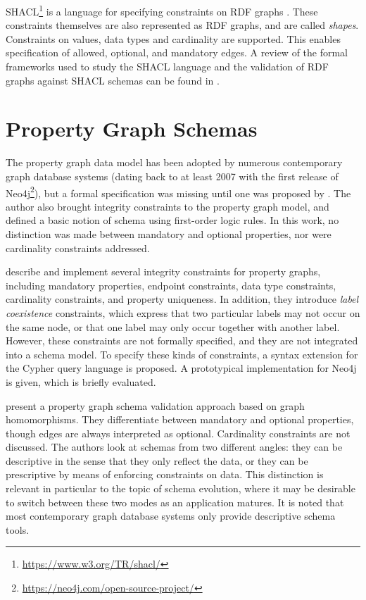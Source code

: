 \documentclass{report}
\theoremstyle{definition}
\begin{document}
SHACL\footnote{\url{https://www.w3.org/TR/shacl/}} is a language for specifying constraints on RDF graphs \citep{pan2009rdf}. These constraints themselves are also represented as RDF graphs, and are called \emph{shapes}. Constraints on values, data types and cardinality are supported. This enables specification of allowed, optional, and mandatory edges. A review of the formal frameworks used to study the SHACL language and the validation of RDF graphs against SHACL schemas can be found in \citet{pareti2022shacl}.

\section{Property Graph Schemas}

The property graph data model has been adopted by numerous contemporary graph database systems (dating back to at least 2007 with the first release of Neo4j\footnote{\url{https://neo4j.com/open-source-project/}}), but a formal specification was missing until one was proposed by \citet{angles2018property}. The author also brought integrity constraints to the property graph model, and defined a basic notion of schema using first-order logic rules. In this work, no distinction was made between mandatory and optional properties, nor were cardinality constraints addressed.

\citet{pokorny2017integrity} describe and implement several integrity constraints for property graphs, including mandatory properties, endpoint constraints, data type constraints, cardinality constraints, and property uniqueness. In addition, they introduce \emph{label coexistence} constraints, which express that two particular labels may not occur on the same node, or that one label may only occur together with another label. However, these constraints are not formally specified, and they are not integrated into a schema model. To specify these kinds of constraints, a syntax extension for the Cypher query language \citep{francis2018cypher} is proposed. A prototypical implementation for Neo4j is given, which is briefly evaluated.

\citet{bonifati2019schema} present a property graph schema validation approach based on graph homomorphisms. They differentiate between mandatory and optional properties, though edges are always interpreted as optional. Cardinality constraints are not discussed. The authors look at schemas from two different angles: they can be descriptive in the sense that they only reflect the data, or they can be prescriptive by means of enforcing constraints on data. This distinction is relevant in particular to the topic of schema evolution, where it may be desirable to switch between these two modes as an application matures. It is noted that most contemporary graph database systems only provide descriptive schema tools.
\end{document}
